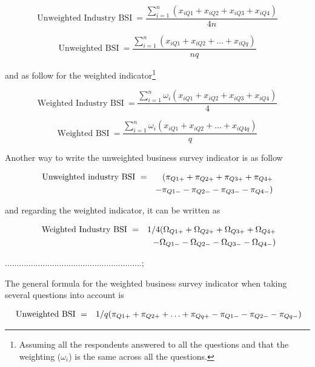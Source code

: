 \documentclass[12pt,a4paper,oneside]{book}
\begin{document}
\begin{equation}
    \mbox{Unweighted Industry BSI}\ = \frac{\sum^n_{i=1}(x_{iQ1} + x_{iQ2} + x_{iQ3} + x_{iQ4})}{4n} 
\end{equation} 

\begin{equation}
    \mbox{Unweighted BSI}\ = \frac{\sum^n_{i=1}( x_{iQ1} + x_{iQ2} + \ldots + x_{iQq})}{nq} 
\end{equation} 

and as follow for the weighted indicator\footnote{Assuming all the respondents answered to all the questions and that the weighting ($\omega_i$) is the same across all the questions.}


\begin{equation}
    \mbox{Weighted Industry BSI}\ = \frac{\sum^n_{i=1} \omega_i (x_{iQ1} + x_{iQ2} + x_{iQ3} + x_{iQ4})}{4} 
\end{equation} 

\begin{equation}
    \mbox{Weighted BSI}\ = \frac{\sum^n_{i=1} \omega_i ( x_{iQ1} + x_{iQ2} +\ldots + x_{iQ4q})}{q} 
\end{equation} 


Another way to write the unweighted business survey indicator is as follow

\begin{eqnarray}
    \mbox{Unweighted industry BSI}\ &=& \Large( \pi_{Q1+} + \pi_{Q2+} + \pi_{Q3+} + \pi_{Q4+} \nonumber \\
    && - \pi_{Q1-} - \pi_{Q2-} - \pi_{Q3-} - \pi_{Q4-} \Large)
\end{eqnarray}

and regarding the weighted indicator, it can be written as

\begin{eqnarray}
    \mbox{ Weighted Industry BSI}\ &=& 1/4 ( \Omega_{Q1+} + \Omega_{Q2+} + \Omega_{Q3+} + \Omega_{Q4+} \nonumber \\
    && - \Omega_{Q1-} - \Omega_{Q2-} - \Omega_{Q3-} - \Omega_{Q4-} \Large) 
\end{eqnarray}

..........................................................;

The general formula for the weighted business survey indicator when taking several questions into account is

\begin{eqnarray}
    \mbox{ Unweighted BSI}\ &=& 1/q ( \pi_{Q1+} +  \pi_{Q2+} + \ldots +  \pi_{Qq+}  -  \pi_{Q1-} -  \pi_{Q2-} -  \pi_{Qq-} \Large) 
\end{eqnarray}
\end{document}
